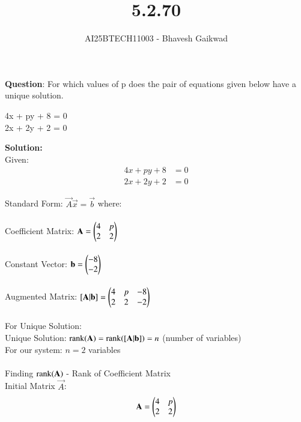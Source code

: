 \documentclass[journal]{IEEEtran}
\begin{document}

\vspace{3cm}

\title{5.2.70}
\author{AI25BTECH11003 - Bhavesh Gaikwad}
{\let\newpage\relax\maketitle}

\renewcommand{\thefigure}{\theenumi}
\renewcommand{\thetable}{\theenumi}
\setlength{\intextsep}{10pt} 


\renewcommand{\thetable}{\theenumi}


\textbf{Question}: 
For which values of p does the pair of equations given below have a unique solution.
\begin{center}
4x + py + 8 = 0 \\
2x + 2y + 2 = 0 
\end{center}

\textbf{Solution:}\\
Given:
\begin{align}
4x + py + 8 &= 0 \\
2x + 2y + 2 &= 0
\end{align}

Standard Form: $ \vec{A}\vec{x} = \vec{b} $ where:\\\\
Coefficient Matrix: $ \mathbf{A} = \begin{pmatrix}4 & p \\ 2 & 2\end{pmatrix} $\\\\
Constant Vector: $ \mathbf{b} = \begin{pmatrix}-8 \\ -2\end{pmatrix} $\\\\
Augmented Matrix: $ [\mathbf{A}|\mathbf{b}] = \begin{pmatrix}4 & p & -8 \\ 2 & 2 & -2\end{pmatrix} $\\\\



For Unique Solution:\\
Unique Solution: $ \text{rank}(\mathbf{A}) = \text{rank}([\mathbf{A}|\mathbf{b}]) = n $ (number of variables)\\
For our system: $ n = 2 $ variables\\\\

Finding $\text{rank}(\mathbf{A})$ - Rank of Coefficient Matrix\\

Initial Matrix $ \vec{A} $:
\begin{equation}
\mathbf{A} = \begin{pmatrix}4 & p \\ 2 & 2\end{pmatrix}
\end{equation}
\end{document}

